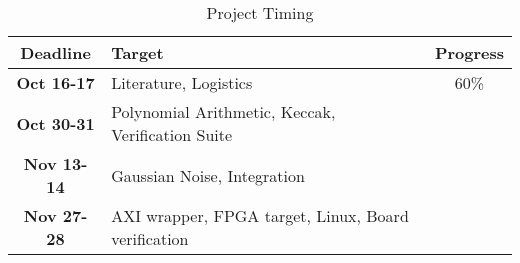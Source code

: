  \begin{table}
 \begin{adjustbox}{width=1.2\textwidth,center=\textwidth}
 \begin{tabular}{|c |l |c|}
   \rowcolor{DispositionColor!50}              %
   \textbf{Deadline}  & \textbf{Target} & \textbf{Progress} \\ \hline
   \textbf{Oct 16-17} & Literature, Logistics & 60\% \\
   \textbf{Oct 30-31} & Polynomial Arithmetic, Keccak, Verification Suite &  \\
   \textbf{Nov 13-14} & Gaussian Noise, Integration &  \\
   \textbf{Nov 27-28} & AXI wrapper, FPGA target, Linux, Board verification  &  \\
   \hline
 \end{tabular}
\end{adjustbox}
\caption{Project Timing}
\label{table:schedule}
\end{table}